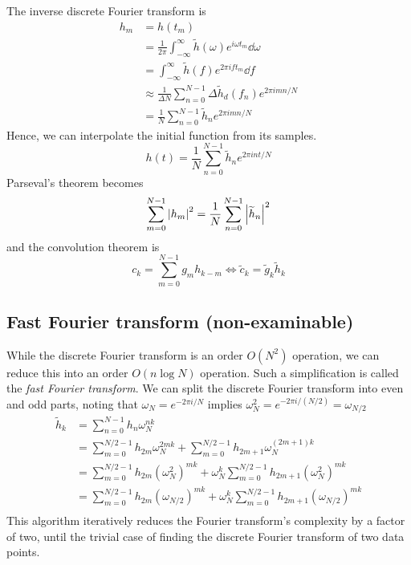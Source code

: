 The inverse discrete Fourier transform is
\begin{align*}
	h_m & = h(t_m)                                                                                  \\
	    & = \frac{1}{2\pi} \int_{-\infty}^\infty \widetilde h(\omega) e^{i \omega t_m} \dd{\omega}  \\
	    & = \int_{-\infty}^\infty \widetilde h(f) e^{2\pi i f t_m} \dd{f}                           \\
	    & \approx \frac{1}{\Delta N} \sum_{n=0}^{N-1} \Delta \widetilde h_d(f_n) e^{2\pi i m n / N} \\
	    & = \frac{1}{N} \sum_{n=0}^{N-1} \widetilde h_n e^{2\pi i m n / N}
\end{align*}
Hence, we can interpolate the initial function from its samples.
\[
	h(t) = \frac{1}{N} \sum_{n=0}^{N-1} \widetilde h_n e^{2\pi i n t / N}
\]
Parseval's theorem becomes
\[
	\sum_{m=0}^{N-1} \abs{h_m}^2 = \frac{1}{N} \sum_{n=0}^{N-1} \abs{\widetilde h_n}^2
\]
and the convolution theorem is
\[
	c_k = \sum_{m=0}^{N-1} g_m h_{k-m} \iff \widetilde c_k = \widetilde g_k \widetilde h_k
\]

\subsection{Fast Fourier transform (non-examinable)}
While the discrete Fourier transform is an order \( O(N^2) \) operation, we can reduce this into an order \( O(n \log N) \) operation.
Such a simplification is called the \textit{fast Fourier transform}.
We can split the discrete Fourier transform into even and odd parts, noting that \( \omega_N = e^{-2\pi i / N} \) implies \( \omega_N^2 = e^{-2 \pi i / (N/2)} = \omega_{N/2} \)
\begin{align*}
	\widetilde h_k & = \sum_{n=0}^{N-1} h_n \omega_N^{nk}                                                                           \\
	               & = \sum_{m=0}^{N/2-1} h_{2m} \omega_N^{2mk} + \sum_{m=0}^{N/2-1} h_{2m + 1} \omega_N^{(2m+1)k}                  \\
	               & = \sum_{m=0}^{N/2-1} h_{2m} (\omega_N^2)^{mk} + \omega_N^k \sum_{m=0}^{N/2-1} h_{2m + 1} (\omega_N^2)^{mk}     \\
	               & = \sum_{m=0}^{N/2-1} h_{2m} (\omega_{N/2})^{mk} + \omega_N^k \sum_{m=0}^{N/2-1} h_{2m + 1} (\omega_{N/2})^{mk} \\
\end{align*}
This algorithm iteratively reduces the Fourier transform's complexity by a factor of two, until the trivial case of finding the discrete Fourier transform of two data points.
